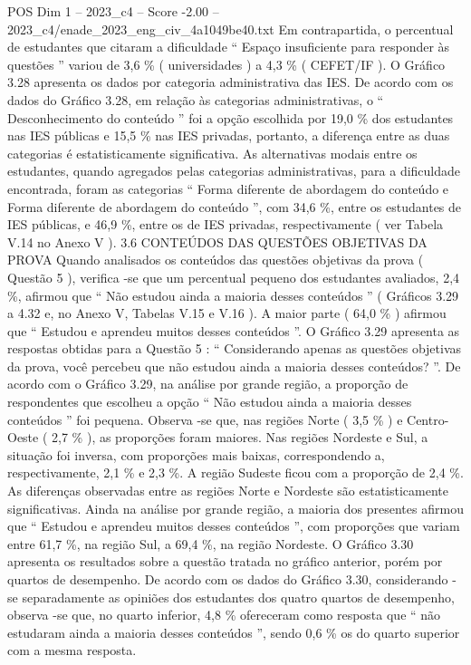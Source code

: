 \begin{textsample}{POS Dim 1 – 2023\_c4 – Score -2.00 – 2023\_c4/enade\_2023\_eng\_civ\_4a1049be40.txt}
Em contrapartida, o percentual de estudantes que citaram a dificuldade “ Espaço insuficiente para responder às questões ” variou de 3,6 \% ( universidades ) a 4,3 \% ( CEFET/IF ).
O Gráfico 3.28 apresenta os dados por categoria administrativa das IES.
De acordo com os dados do Gráfico 3.28, em relação às categorias administrativas, o “ Desconhecimento do conteúdo ” foi a opção escolhida por 19,0 \% dos estudantes nas IES públicas e 15,5 \% nas IES privadas, portanto, a diferença entre as duas categorias é estatisticamente significativa.
As alternativas modais entre os estudantes, quando agregados pelas categorias administrativas, para a dificuldade encontrada, foram as categorias “ Forma diferente de abordagem do conteúdo e Forma diferente de abordagem do conteúdo ”, com 34,6 \%, entre os estudantes de IES públicas, e 46,9 \%, entre os de IES privadas, respectivamente ( ver Tabela V.14 no Anexo V ). 3.6 CONTEÚDOS DAS QUESTÕES OBJETIVAS DA PROVA Quando analisados os conteúdos das questões objetivas da prova ( Questão 5 ), verifica -se que um percentual pequeno dos estudantes avaliados, 2,4 \%, afirmou que “ Não estudou ainda a maioria desses conteúdos ” ( Gráficos 3.29 a 4.32 e, no Anexo V, Tabelas V.15 e V.16 ).
A maior parte ( 64,0 \% ) afirmou que “ Estudou e aprendeu muitos desses conteúdos ”.
O Gráfico 3.29 apresenta as respostas obtidas para a Questão 5 : “ Considerando apenas as questões objetivas da prova, você percebeu que não estudou ainda a maioria desses conteúdos? ”.
De acordo com o Gráfico 3.29, na análise por grande região, a proporção de respondentes que escolheu a opção “ Não estudou ainda a maioria desses conteúdos ” foi pequena.
Observa -se que, nas regiões Norte ( 3,5 \% ) e Centro-Oeste ( 2,7 \% ), as proporções foram maiores.
Nas regiões Nordeste e Sul, a situação foi inversa, com proporções mais baixas, correspondendo a, respectivamente, 2,1 \% e 2,3 \%.
A região Sudeste ficou com a proporção de 2,4 \%.
As diferenças observadas entre as regiões Norte e Nordeste são estatisticamente significativas.
Ainda na análise por grande região, a maioria dos presentes afirmou que “ Estudou e aprendeu muitos desses conteúdos ”, com proporções que variam entre 61,7 \%, na região Sul, a 69,4 \%, na região Nordeste.
O Gráfico 3.30 apresenta os resultados sobre a questão tratada no gráfico anterior, porém por quartos de desempenho.
De acordo com os dados do Gráfico 3.30, considerando -se separadamente as opiniões dos estudantes dos quatro quartos de desempenho, observa -se que, no quarto inferior, 4,8 \% ofereceram como resposta que “ não estudaram ainda a maioria desses conteúdos ”, sendo 0,6 \% os do quarto superior com a mesma resposta.

\end{textsample}
